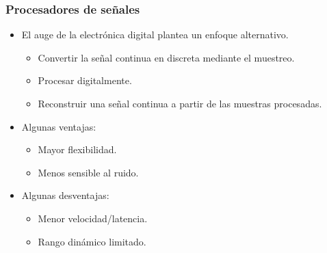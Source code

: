 \begin{frame}\frametitle{Procesadores de señales}
  \begin{center}
  \end{center}
  \begin{itemize}
    \item El auge de la electrónica digital plantea un enfoque alternativo.
    \begin{itemize}
      \item Convertir la señal continua en discreta mediante el muestreo.
      \item Procesar digitalmente.
      \item Reconstruir una señal continua a partir de las muestras procesadas. 

    \end{itemize}
    \item Algunas ventajas:
    \begin{itemize}
      \item Mayor flexibilidad.
      \item Menos sensible al ruido.
    \end{itemize}
    \item Algunas desventajas:
    \begin{itemize}
      \item Menor velocidad/latencia.
      \item Rango dinámico limitado.
    \end{itemize}
  \end{itemize}
\end{frame}

